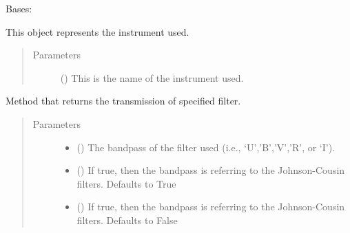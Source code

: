 \documentclass[letterpaper,10pt,english]{sphinxmanual}
\begin{document}
\begin{fulllineitems}
\label{\detokenize{modules:arc.Instrument}}
Bases: 

This object represents the instrument used.
\begin{quote}\begin{description}
\item[{Parameters}] \leavevmode
{} () \textendash{} This is the name of the instrument used.

\end{description}\end{quote}

\begin{fulllineitems}
\label{\detokenize{modules:arc.Instrument.filter}}
Method that returns the transmission of specified filter.
\begin{quote}\begin{description}
\item[{Parameters}] \leavevmode\begin{itemize}
\item {} 
 () \textendash{} The bandpass of the filter used (i.e., ‘U’,’B’,’V’,’R’, or ‘I’).

\item {} 
 (\sphinxstyleliteralemphasis{\sphinxupquote{, }}) \textendash{} If true, then the bandpass is referring to the Johnson-Cousin filters. Defaults to True

\item {} 
 (\sphinxstyleliteralemphasis{\sphinxupquote{, }}) \textendash{} If true, then the bandpass is referring to the Johnson-Cousin filters. Defaults to False


\end{itemize}
\end{description}
\end{quote}
\end{fulllineitems}
\end{fulllineitems}
\end{document}
